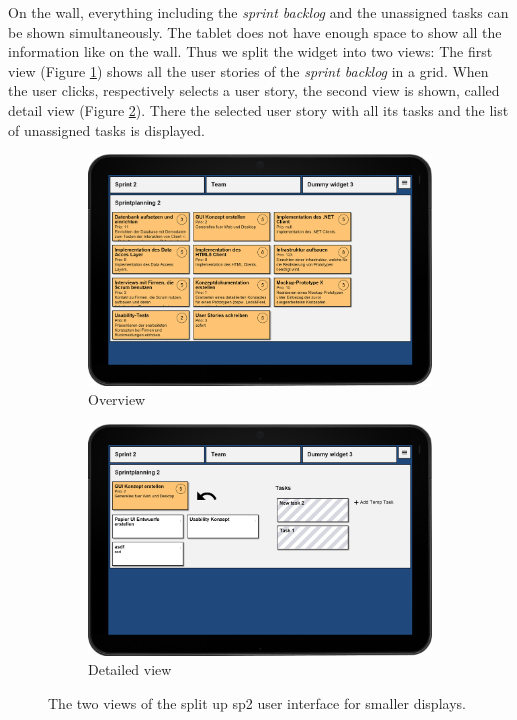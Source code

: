 \documentclass{sigchi}
\begin{document}
On the wall, everything including the \textit{sprint backlog} and the unassigned tasks can be shown simultaneously.
The tablet does not have enough space to show all the information like on the wall.
Thus we split the widget into two views:
The first view (Figure \ref{fig:sp2-overview}) shows all the user stories of the \textit{sprint backlog} in a grid.
When the user clicks, respectively selects a user story, the second view is shown, called detail view (Figure \ref{fig:sp2-detail}).
There the selected user story with all its tasks and the list of unassigned tasks is displayed.


\begin{figure}
	\centering
	\begin{subfigure}[b]{1\columnwidth}
		\includegraphics[width=\textwidth]{figures/sp2-overview-framed}
		\caption{Overview}
		\label{fig:sp2-overview}
	\end{subfigure}%
	\quad
	\begin{subfigure}[b]{1\columnwidth}
		\includegraphics[width=\textwidth]{figures/sp2-detail-framed}
		\caption{Detailed view}
		\label{fig:sp2-detail}
	\end{subfigure}
	
	\caption{The two views of the split up \gls{sp2} user interface for smaller displays.}\label{fig:sp2-smallscreen-views}
\end{figure}
\end{document}
